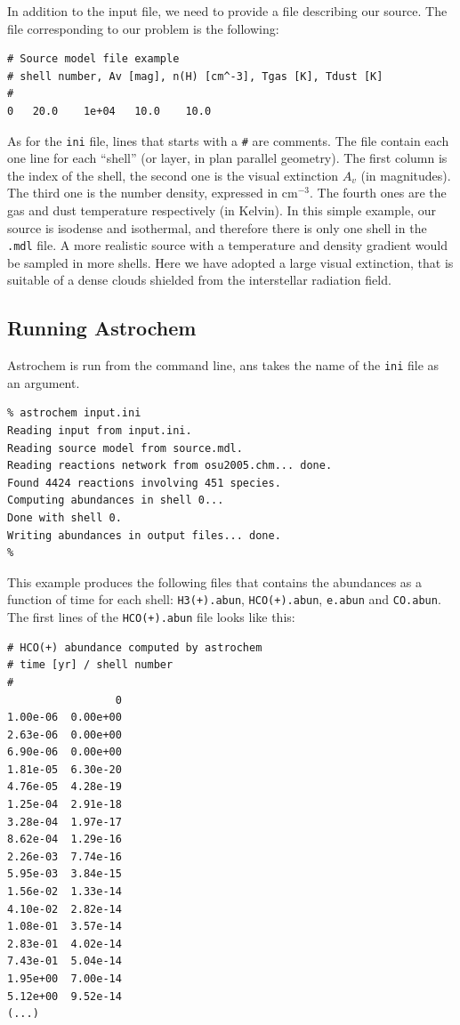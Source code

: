 \documentclass[a4paper,12pt]{article}
\begin{document}
{In addition to the input file, we need to provide a file describing
our source. The file corresponding to our problem is the following:

\begin{verbatim}
# Source model file example
# shell number, Av [mag], n(H) [cm^-3], Tgas [K], Tdust [K]
#
0	20.0	1e+04	10.0	10.0
\end{verbatim}

As for the \verb=ini= file, lines that starts with a \verb=#= are
comments. The file contain each one line for each ``shell'' (or layer,
in plan parallel geometry). The first column is the index of the
shell, the second one is the visual extinction $A_{v}$ (in
magnitudes). The third one is the number density, expressed in
cm$^{-3}$. The fourth ones are the gas and dust temperature
respectively (in Kelvin). In this simple example, our source is
isodense and isothermal, and therefore there is only one shell in the
\verb=.mdl= file. A more realistic source with a temperature and
density gradient would be sampled in more shells. Here we have adopted
a large visual extinction, that is suitable of a dense clouds shielded
from the interstellar radiation field.

\subsection{Running Astrochem}
\label{sec:running-astrochem}

Astrochem is run from the command line, ans takes the name of the
\verb=ini= file as an argument.

\begin{verbatim}
% astrochem input.ini
Reading input from input.ini.
Reading source model from source.mdl.
Reading reactions network from osu2005.chm... done.
Found 4424 reactions involving 451 species.
Computing abundances in shell 0...
Done with shell 0.
Writing abundances in output files... done.
%
\end{verbatim}

This example produces the following files that contains the abundances
as a function of time for each shell: \verb=H3(+).abun=,
\verb=HCO(+).abun=, \verb=e.abun= and \verb=CO.abun=. The first lines
of the \verb=HCO(+).abun= file looks like this:

\begin{verbatim}
# HCO(+) abundance computed by astrochem
# time [yr] / shell number
#
                 0
1.00e-06  0.00e+00
2.63e-06  0.00e+00
6.90e-06  0.00e+00
1.81e-05  6.30e-20
4.76e-05  4.28e-19
1.25e-04  2.91e-18
3.28e-04  1.97e-17
8.62e-04  1.29e-16
2.26e-03  7.74e-16
5.95e-03  3.84e-15
1.56e-02  1.33e-14
4.10e-02  2.82e-14
1.08e-01  3.57e-14
2.83e-01  4.02e-14
7.43e-01  5.04e-14
1.95e+00  7.00e-14
5.12e+00  9.52e-14
(...)
\end{verbatim}

}
\end{document}
